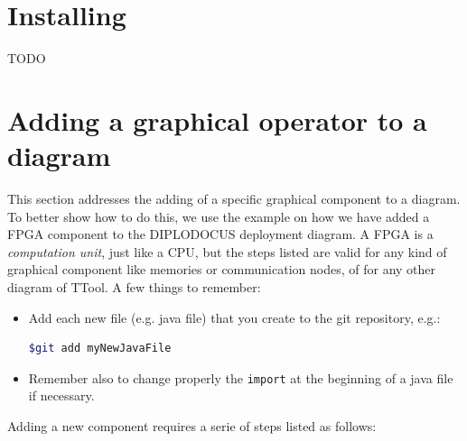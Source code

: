 \documentclass[12pt]{article}
\begin{document}
\newpage 

\section{Installing}
TODO

\newpage

\section{Adding a graphical operator to a diagram}
This section addresses the adding of a specific graphical component to a diagram. To better show how to do this, we use the example on how we have added a FPGA component to the DIPLODOCUS deployment diagram. A FPGA is a \textit{computation unit}, just like a CPU, but the steps listed are valid for any kind of graphical component like memories or communication nodes, of for any other diagram of TTool. A few things to remember:
\begin{itemize}
\item Add each new file (e.g. java file) that you create to the git repository, e.g.:
\begin{lstlisting}[showspaces=true, language=bash, commentstyle=\color{pgreen},
keywordstyle=\color{pblue}, stringstyle=\color{pred}, basicstyle=\ttfamily]
$git add myNewJavaFile
\end{lstlisting}
\item Remember also to change properly the \texttt{import} at the beginning of a java file if necessary. 
\end{itemize}
Adding a new component requires a serie of steps listed as follows: 
\end{document}
